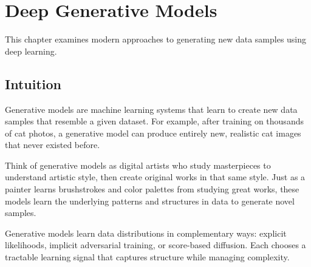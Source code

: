 
\chapter{Deep Generative Models}
\label{chap:deep-generative-models}

This chapter examines modern approaches to generating new data samples using deep learning.


\begin{learningobjectives}
\end{learningobjectives}



\section*{Intuition}

Generative models are machine learning systems that learn to create new data samples that resemble a given dataset. For example, after training on thousands of cat photos, a generative model can produce entirely new, realistic cat images that never existed before.

Think of generative models as digital artists who study masterpieces to understand artistic style, then create original works in that same style. Just as a painter learns brushstrokes and color palettes from studying great works, these models learn the underlying patterns and structures in data to generate novel samples.

Generative models learn data distributions in complementary ways: explicit likelihoods, implicit adversarial training, or score-based diffusion. Each chooses a tractable learning signal that captures structure while managing complexity.












